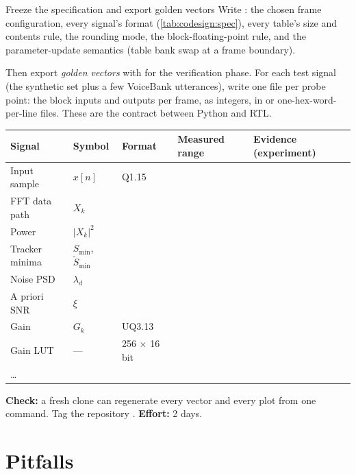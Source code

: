 \begin{stepbox}[label=st:codesign:freeze]{Freeze the specification and export golden vectors}
Write : the chosen frame configuration, every signal's format
(\cref{tab:codesign:spec}), every table's size and contents rule, the rounding
mode, the block-floating-point rule, and the parameter-update semantics
(table bank swap at a frame boundary).

Then export \emph{golden vectors} with  for the
verification phase. For each test signal (the synthetic set plus a few
VoiceBank utterances), write one file per probe point: the block inputs and
outputs per frame, as integers, in  or one-hex-word-per-line
 files. These are the contract between Python and RTL.

\begin{center}\footnotesize
{}
\label{tab:codesign:spec}
\begin{tabularx}{\textwidth}{@{}llllL@{}}
\toprule
Signal & Symbol & Format & Measured range & Evidence (experiment) \\
\midrule
Input sample & $x[n]$ & Q1.15 & &  \\
FFT data path & $X_k$ & & & \\
Power & $|X_k|^2$ & & & \\
Tracker minima & $S_\text{min}$, $\tilde S_\text{min}$ & & & \\
Noise PSD & $\lambda_d$ & & & \\
A priori SNR & $\xi$ & & & \\
Gain & $G_k$ & UQ3.13 & & \\
Gain LUT & --- & 256 $\times$ 16 bit & & \\
\ldots & & & & \\
\bottomrule
\end{tabularx}
\end{center}

\textbf{Check:} a fresh clone can regenerate every vector and every plot from
one command. Tag the repository . \textbf{Effort:} 2 days.
\end{stepbox}

\section{Pitfalls}\label{sec:codesign:pitfalls}

